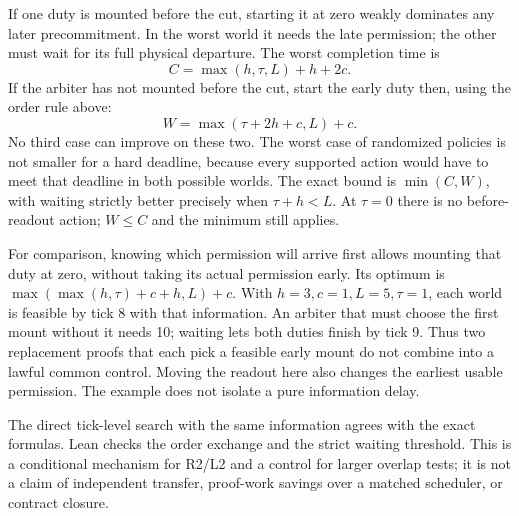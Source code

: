 \documentclass{article}
\begin{document}
If one duty is mounted before the cut, starting it at zero
weakly dominates any later precommitment. In the worst world
it needs the late permission; the other must wait for its full
physical departure. The worst completion time is
\[
 C=\max(h,\tau,L)+h+2c.
\]
If the arbiter has not mounted before the cut, start the early
duty then, using the order rule above:
\[
 W=\max(\tau+2h+c,L)+c.
\]
No third case can improve on these two. The worst case of
randomized policies is not smaller for a hard deadline, because
every supported action would have to meet that deadline in both
possible worlds. The exact bound is $\min(C,W)$, with waiting
strictly better precisely when $\tau+h<L$. At $\tau=0$ there is
no before-readout action; $W\le C$ and the minimum still applies.

For comparison, knowing which permission will arrive first
allows mounting that duty at zero, without taking its actual
permission early. Its optimum is
$\max(\max(h,\tau)+c+h,L)+c$. With $h=3,c=1,L=5,\tau=1$,
each world is feasible by tick 8 with that information.
An arbiter that must choose the first mount without it needs 10;
waiting lets both duties finish by tick 9. Thus two replacement
proofs that each pick a feasible early mount do not combine into
a lawful common control. Moving the readout here also changes the earliest usable
permission. The example does not isolate a pure information delay.

The direct tick-level search with the same information agrees
with the exact formulas. Lean checks the order exchange and
the strict waiting threshold. This is a conditional mechanism
for R2/L2 and a control for larger overlap tests; it is not a
claim of independent transfer, proof-work savings over a matched
scheduler, or contract closure.
\end{document}

